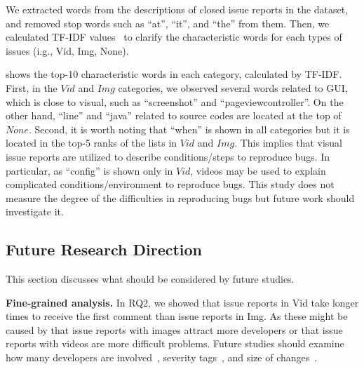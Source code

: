 We extracted words from the descriptions of closed issue reports in the dataset, and  removed stop words such as ``at'', ``it'', and ``the'' from them. 
Then, we calculated TF-IDF values~\citep{salton1988-tfidf} to clarify the characteristic words for each types of issues (i.g., Vid, Img, None). 

 shows the top-10 characteristic words in each category, calculated by TF-IDF.
First, in the $Vid$ and $Img$ categories, we observed several words related to GUI, which is close to visual, such as ``screenshot'' and ``pageviewcontroller''. 
On the other hand, ``line'' and ``java'' related to source codes are located at the top of $None$.
Second, it is worth noting that ``when'' is shown in all categories but it is located in the top-5 ranks of the lists in $Vid$ and $Img$.
This implies that visual issue reports are utilized to describe conditions/steps to reproduce bugs. In particular, as ``config'' is shown only in $Vid$, videos may be used to explain complicated conditions/environment to reproduce bugs. This study does not measure the degree of the difficulties in reproducing bugs but future work should investigate it.



\subsection{Future Research Direction}
This section discusses what should be considered by future studies. 

\noindent
\textbf{Fine-grained analysis. }
In RQ2, we showed that issue reports in Vid take longer times to receive the first comment than issue reports in Img. 
As these might be caused by that issue reports with images attract more developers or that issue reports with videos are more difficult problems.
Future studies should examine how many developers are involved~\citep{DBLP:conf/icsm/BavotaR15}, severity tags~\citep{DBLP:conf/issre/ZhouNG15}, and size of changes~\citep{DBLP:conf/kbse/HattoriL08}.

